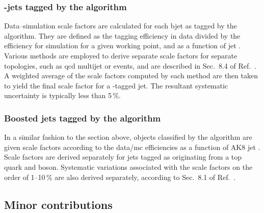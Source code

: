 

\subsubsection{\texorpdfstring{\Pbottom-jets}{b-jets} tagged by the \texorpdfstring{\deepcsv}{DeepCSV} algorithm}
\label{subsubsec:htoinv_btagging_sfs}

Data--simulation scale factors are calculated for each \gls{bjet} as tagged by the \deepcsv algorithm. They are defined as the tagging efficiency in data divided by the efficiency for simulation for a given working point, and as a function of \gls{jet} \pt. Various methods are employed to derive separate scale factors for separate topologies, such as \acrshort{qcd} multijet or \ttbar events, and are described in Sec.~8.4 of Ref.~. A weighted average of the scale factors computed by each method are then taken to yield the final scale factor for a \Pbottom-tagged \gls{jet}. The resultant systematic uncertainty is typically less than 5\,\%.





\subsubsection{Boosted jets tagged by the \texorpdfstring{\deepakeight}{DeepAK8} algorithm}
\label{subsubsec:htoinv_deepak8_sfs}

In a similar fashion to the section above, objects classified by the \deepakeight algorithm are given scale factors according to the data/\acrshort{mc} efficiencies as a function of AK8 \gls{jet} \pt. Scale factors are derived separately for \glspl{jet} tagged as originating from a top quark and \PVec boson. Systematic variations associated with the scale factors on the order of 1--10\,\% are also derived separately, according to Sec.~8.1 of Ref.~.




\subsection{Minor contributions}
\label{subsec:htoinv_minor_weights_systs}

